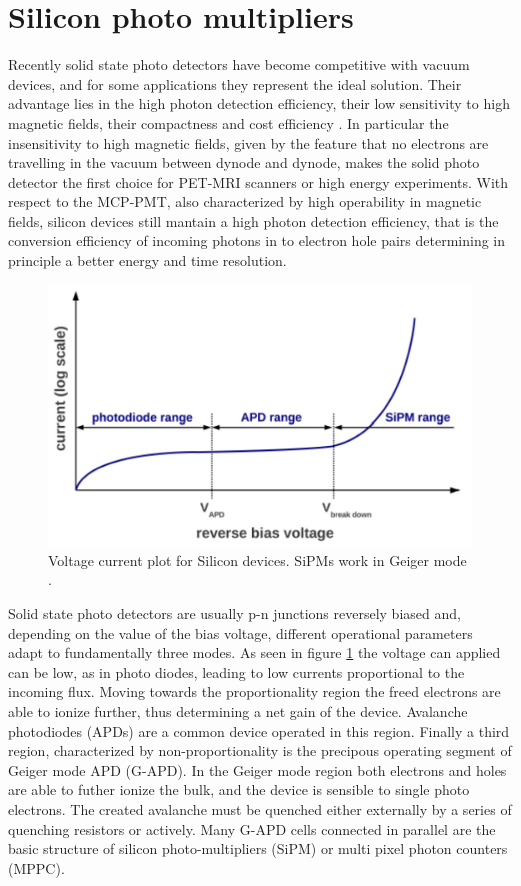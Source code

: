 \section{Silicon photo multipliers}
Recently solid state photo detectors have become competitive with vacuum devices, and for some applications they represent the ideal solution. Their advantage lies in the high photon detection efficiency, their low sensitivity to high magnetic fields, their compactness and cost efficiency \cite{Dolgoshein2003}.
In particular the insensitivity to high magnetic fields, given by the feature that no electrons are travelling in the vacuum between dynode and dynode, makes the solid photo detector the first choice for PET-MRI scanners or high energy experiments. With respect to the MCP-PMT, also characterized by high operability in magnetic fields, silicon devices still mantain a high photon detection efficiency, that is the conversion efficiency of incoming photons in to electron hole pairs determining in principle a better energy and time resolution.
\begin{figure}[htbp]
\begin{center}
\includegraphics[width=12cm]{../Pictures/Chapter_3/avalanche.pdf}
\end{center}
\caption[I-V plot Silicon detectors]{Voltage current plot for Silicon devices. SiPMs work in Geiger mode \cite{Gundacker2014}.}
\label{fig:avalanche}
\end{figure}

Solid state photo detectors are usually p-n junctions reversely biased and, depending on the value of the bias voltage, different operational parameters adapt to fundamentally three modes.
As seen in figure \ref{fig:avalanche} the voltage can applied can be low, as in photo diodes, leading to low currents proportional to the incoming flux. Moving towards the proportionality region the freed electrons are able to ionize further, thus determining a net gain of the device. Avalanche photodiodes (APDs) are a common device operated in this region.
Finally a third region, characterized by non-proportionality is the precipous operating segment of Geiger mode APD (G-APD). In the Geiger mode region both electrons and holes are able to futher ionize the bulk, and the device is sensible to single photo electrons. The created avalanche must be quenched either externally by a series of quenching resistors or actively.
Many G-APD cells connected in parallel are the basic structure of silicon photo-multipliers (SiPM) or multi pixel photon counters (MPPC).

